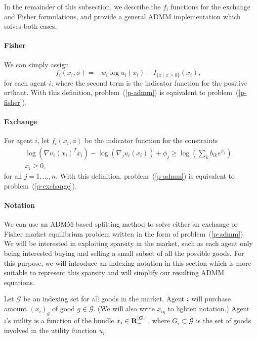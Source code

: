 \documentclass[12pt]{article}
\begin{document}
In the remainder of this subsection, we describe the $f_i$ functions for the
exchange and Fisher formulations, and provide a general ADMM implementation
which solves both cases.

\paragraph{Fisher}
We can simply assign
\[
f_i(x_i, \phi) = -w_i \log u_i(x_i) + I_{\lbrace x \mid x \geq 0 \rbrace}(x_i),
\]
for each agent $i$,
where the second term is the indicator function for the positive orthant.
With this definition, problem~(\ref{p-admm}) is equivalent to
problem~(\ref{p-fisher}).

\paragraph{Exchange}

For agent $i$, let $f_i(x_i, \phi)$ be the indicator function for the
constraints
\[
\begin{array}{c}
\log(\nabla u_i(x_i)^T x_i) - \log(\nabla_j u_i(x_i)) + \phi_j \geq  \log\left(\sum_k b_{ik} e^{\phi_{k}}\right)\\
x_i \geq 0,
\end{array}
\]
for all $j=1,\ldots,n$.
With this definition, problem~(\ref{p-admm}) is equivalent to problem~(\ref{p-exchange}).


\paragraph{Notation}

We can use an ADMM-based splitting method \cite{boyd2011distributed} to solve
either an exchange or Fisher market equilibrium problem written in the form of
problem~(\ref{p-admm}). We will be interested in exploiting sparsity in the
market, such as each agent only being interested buying and selling a small
subset  of all the possible goods. For this purpose, we will introduce an
indexing notation in this section which is more suitable to represent this
sparsity and will simplify our resulting ADMM equations.

Let $\mathcal{G}$ be an indexing set for all goods
in the market.
Agent $i$ will purchase amount $(x_i)_g$ of good $g \in \mathcal{G}$.
(We will also write $x_{ig}$ to lighten notation.)
Agent $i$'s utility is a function of the bundle $x_i \in {\mbox{\bf R}}_{+}^{|G_i|}$,
where $G_i \subset \mathcal{G}$ is the set of goods involved in the utility
function $u_i$.
\end{document}
